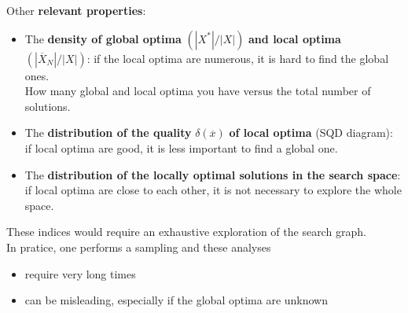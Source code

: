 \documentclass[11pt]{article}
\begin{document}
	\newpage
	
	Other \textbf{relevant properties}:
	\begin{itemize}
		\item The \textbf{density of global optima} $( |X^\ast|/|X |)$ \textbf{and local optima} $( | \overline{X}_N | / |X | )$: if the local optima are numerous, it is hard to find the global ones. \\
		How many global and local optima you have versus the total number of solutions. \\
		
		\item The \textbf{distribution of the quality} $\delta (\overline{x})$ \textbf{of local optima} (SQD diagram): if local optima are good, it is less important to find a global one. \\
		
		\item The \textbf{distribution of the locally optimal solutions in the search space}: if local optima are close to each other, it is not necessary to explore the whole space.\\
	\end{itemize}
	
	These indices would require an exhaustive exploration of the search graph.\\
	
	In pratice, one performs a sampling and these analyses
	\begin{itemize}
		\item require very long times
		\item can be misleading, especially if the global optima are unknown
	\end{itemize}
	
	\newpage
	
\end{document}
